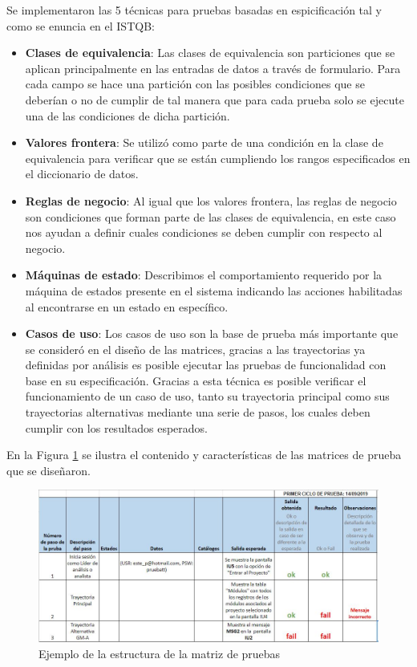 Se implementaron las 5 técnicas para pruebas basadas en espicificación tal y como se enuncia en el ISTQB:

\begin{itemize}
	\item \textbf {Clases de equivalencia}:
	Las clases de equivalencia son particiones que se aplican principalmente en las entradas de datos a través de formulario. Para cada campo se hace una partición con las posibles condiciones que se deberían o no de cumplir de tal manera que para cada prueba solo se ejecute una de las condiciones de dicha partición.
	
	\item \textbf {Valores frontera}:
	Se utilizó como parte de una condición en la clase de equivalencia para verificar que se están cumpliendo los rangos especificados en el diccionario de datos. 
	
	\item \textbf {Reglas de negocio}:
	Al igual que los valores frontera, las reglas de negocio son condiciones que forman parte de las clases de equivalencia, en este caso nos ayudan a definir cuales condiciones se deben cumplir con respecto al negocio. 
	
	\item \textbf {Máquinas de estado}:
	Describimos el comportamiento requerido por la máquina de estados presente en el sistema indicando las acciones habilitadas al encontrarse en un estado en específico.
	
	\item \textbf {Casos de uso}:
	Los casos de uso son la base de prueba más importante que se consideró en el diseño de las matrices, gracias a las trayectorias ya definidas por análisis es posible ejecutar las pruebas de funcionalidad con base en su especificación. Gracias a esta técnica es posible verificar el funcionamiento de un caso de uso, tanto su trayectoria principal como sus trayectorias alternativas mediante una serie de pasos, los cuales deben cumplir con los resultados esperados.
	
\end{itemize}


En la Figura \ref{fig:estructura} se ilustra el contenido y características de las matrices de prueba que se diseñaron.

\begin{figure}[H]
	\begin{center}
		\includegraphics[width=.95\textwidth]{images/pruebas/diseno/tabla}
		\caption{Ejemplo de la estructura de la matriz de pruebas}
		\label{fig:estructura}
	\end{center}
\end{figure}


